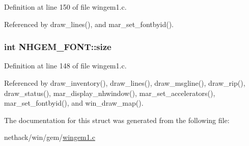 Definition at line 150 of file wingem1.\+c.



Referenced by draw\+\_\+lines(), and mar\+\_\+set\+\_\+fontbyid().

\hypertarget{structNHGEM__FONT_ad4fbac74e23e0597ab14e1b49750a824}{
\subsubsection[{size}]{\setlength{\rightskip}{0pt plus 5cm}int N\+H\+G\+E\+M\+\_\+\+F\+O\+N\+T\+::size}}\label{structNHGEM__FONT_ad4fbac74e23e0597ab14e1b49750a824}


Definition at line 148 of file wingem1.\+c.



Referenced by draw\+\_\+inventory(), draw\+\_\+lines(), draw\+\_\+msgline(), draw\+\_\+rip(), draw\+\_\+status(), mar\+\_\+display\+\_\+nhwindow(), mar\+\_\+set\+\_\+accelerators(), mar\+\_\+set\+\_\+fontbyid(), and win\+\_\+draw\+\_\+map().



The documentation for this struct was generated from the following file\+:\begin{DoxyCompactItemize}
\item 
nethack/win/gem/\hyperlink{wingem1_8c}{wingem1.\+c}\end{DoxyCompactItemize}
